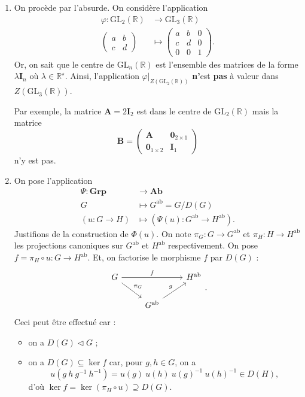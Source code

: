 \documentclass{../../td}
\let\bm\boldsymbol
\begin{document}
  \begin{enumerate}
    \item On procède par l'absurde.
      On considère l'application 
      \begin{align*}
        \varphi: \mathrm{GL}_2(\mathds{R}) &\longrightarrow \mathrm{GL}_3(\mathds{R}) \\
        \begin{pmatrix} a&b\\c&d \end{pmatrix}  &\longmapsto \begin{pmatrix} a & b & 0\\ c & d & 0\\ 0 & 0 & 1 \end{pmatrix} 
      .\end{align*}
      Or, on sait que le centre de $\mathrm{GL}_n(\mathds{R})$ est l'ensemble des matrices de la forme $\lambda \mathbf{I}_n$ où $\lambda \in \mathds{R}^\star$.
      Ainsi, l'application $\varphi\big|_{Z(\mathrm{GL}_2(\mathds{R}))}$ \textbf{n'}est \textbf{pas} à valeur dans $Z(\mathrm{GL}_3(\mathds{R}))$.
      
      Par exemple, la matrice $\bm{A} = 2\mathbf{I}_2$ est dans le centre de $\mathrm{GL}_2(\mathds{R})$ mais la matrice 
      \[
        \bm{B} = \begin{pmatrix} \bm{A} & \mathbf{0}_{2\times 1} \\ \mathbf{0}_{1\times 2} & \mathbf{I}_1 \end{pmatrix} 
      \] n'y est pas.
    \item On pose l'application
      \begin{align*}
        \Psi: \mathbf{Grp} &\longrightarrow \mathbf{Ab} \\
        G &\longmapsto G^\mathrm{ab}=G / D(G)\\
        (u:G\to H) &\longmapsto (\Psi(u) : G^\mathrm{ab} \to H^\mathrm{ab})
      .\end{align*}
      Justifions de la construction de $\Phi(u)$.
      On note $\pi_G : G \to G^\mathrm{ab}$ et $\pi_H : H \to H^\mathrm{ab}$ les projections canoniques sur $G^\mathrm{ab}$ et $H^\mathrm{ab}$ respectivement.
      On pose $f = \pi_H \circ u : G \to H^\mathrm{ab}$.
      Et, on factorise le morphisme $f$ par $D(G)$ :
      \[
      \begin{tikzcd}
        G \arrow{rr}{f} \arrow{dr}{\pi_G} && H^\mathrm{ab}\\
        & G^\mathrm{ab} \arrow{ur}{g}&
      \end{tikzcd}
      .\]
      Ceci peut être effectué car :
      \begin{itemize}
        \item on a $D(G)\triangleleft G$ ;
        \item on a $D(G) \subseteq \ker f$ car, pour $g,h \in G$, on a
          \[
            u(g\:h\:g^{-1}\:h^{-1}) = u(g)\:u(h)\:u(g)^{-1}\:u(h)^{-1} \in D(H)
          ,\] d'où $\ker f = \ker(\pi_H \circ u) \supseteq D(G)$.
      \end{itemize}


\end{enumerate}
\end{document}
